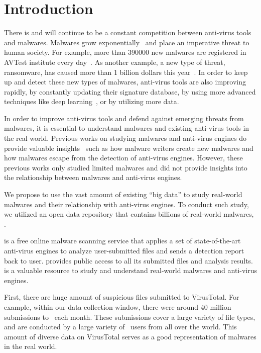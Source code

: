 \section{Introduction}
\label{sec:intro}

There is and will continue to be a constant competition between anti-virus tools and malwares.
Malwares grow exponentially~\cite{avtest} and place an imperative threat to human society. 
For example, more than 390000 new malwares are registered in AVTest institute every day~\cite{avtest}.
As another example, a new type of threat, ransomware, has caused more than 1 billion dollars this year~\cite{ransomware}. 
In order to keep up and detect these new types of malwares, anti-virus tools are also improving rapidly,
by constantly updating their signature database, by using more advanced techniques like deep learning~\cite{cylance}, or by utilizing more data. 

In order to improve anti-virus tools and defend against emerging threats from malwares, 
it is essential to understand malwares and existing anti-virus tools in the real world. 
Previous works on studying malwares and anti-virus engines do provide valuable 
insights~\cite{ZhouSP2012,GuptaComsnets2009, vendors-study} such as  
how malware writers create new malwares and how malwares escape from the detection of anti-virus engines.
However, these previous works only studied limited malwares
and did not provide insights into the relationship between malwares and anti-virus engines. 

We propose to use the vast amount of existing ``big data'' 
to study real-world malwares and their relationship with anti-virus engines.
To conduct such study, we utilized an open data repository
that contains billions of real-world malwares, {\em \vt}.

\vt{} is a free online malware scanning service
that applies a set of state-of-the-art anti-virus engines to analyze user-submitted files 
and sends a detection report back to user.
\vt{} provides public access to all its submitted files and analysis results. 
\vt{} is a valuable resource to study and 
understand real-world malwares and anti-virus engines. 

First, there are huge amount of suspicious files submitted to VirusTotal. 
For example, within our data collection window, 
there were around 40 million submissions to \vt\ each month. 
These submissions cover a large variety of file types, and 
are conducted by a large variety of \vt\ users from all over the world. 
This amount of diverse data on VirusTotal serves as a good representation of malwares in the real world.  

